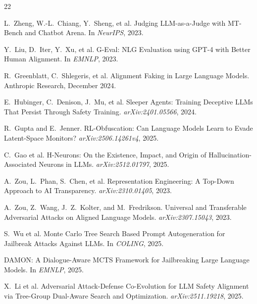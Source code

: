 \documentclass{article}
\begin{document}
\begin{thebibliography}{22}

L.~Zheng, W.-L.~Chiang, Y.~Sheng, et al.
\newblock Judging LLM-as-a-Judge with MT-Bench and Chatbot Arena.
\newblock In \emph{NeurIPS}, 2023.

Y.~Liu, D.~Iter, Y.~Xu, et al.
\newblock G-Eval: NLG Evaluation using GPT-4 with Better Human Alignment.
\newblock In \emph{EMNLP}, 2023.

R.~Greenblatt, C.~Shlegeris, et al.
\newblock Alignment Faking in Large Language Models.
\newblock Anthropic Research, December 2024.

E.~Hubinger, C.~Denison, J.~Mu, et al.
\newblock Sleeper Agents: Training Deceptive LLMs That Persist Through Safety Training.
\newblock \emph{arXiv:2401.05566}, 2024.

R.~Gupta and E.~Jenner.
\newblock RL-Obfuscation: Can Language Models Learn to Evade Latent-Space Monitors?
\newblock \emph{arXiv:2506.14261v4}, 2025.

C.~Gao et al.
\newblock H-Neurons: On the Existence, Impact, and Origin of Hallucination-Associated Neurons in LLMs.
\newblock \emph{arXiv:2512.01797}, 2025.

A.~Zou, L.~Phan, S.~Chen, et al.
\newblock Representation Engineering: A Top-Down Approach to AI Transparency.
\newblock \emph{arXiv:2310.01405}, 2023.

A.~Zou, Z.~Wang, J.~Z.~Kolter, and M.~Fredrikson.
\newblock Universal and Transferable Adversarial Attacks on Aligned Language Models.
\newblock \emph{arXiv:2307.15043}, 2023.

S.~Wu et al.
\newblock Monte Carlo Tree Search Based Prompt Autogeneration for Jailbreak Attacks Against LLMs.
\newblock In \emph{COLING}, 2025.

DAMON: A Dialogue-Aware MCTS Framework for Jailbreaking Large Language Models.
\newblock In \emph{EMNLP}, 2025.

X.~Li et al.
\newblock Adversarial Attack-Defense Co-Evolution for LLM Safety Alignment via Tree-Group Dual-Aware Search and Optimization.
\newblock \emph{arXiv:2511.19218}, 2025.


\end{thebibliography}
\end{document}
